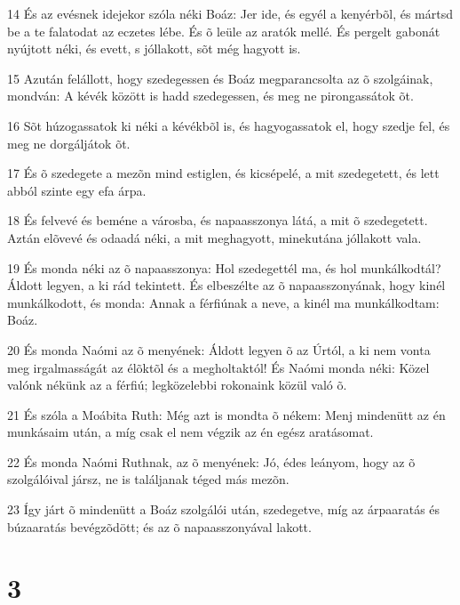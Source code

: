 \par 14 És az evésnek idejekor szóla néki Boáz: Jer ide, és egyél a kenyérbõl, és mártsd be a te falatodat az eczetes lébe. És õ leüle az aratók mellé. És pergelt gabonát nyújtott néki, és evett, s jóllakott, sõt még hagyott is.
\par 15 Azután felállott, hogy szedegessen és Boáz megparancsolta az õ szolgáinak, mondván: A kévék között is hadd szedegessen, és meg ne pirongassátok õt.
\par 16 Sõt húzogassatok ki néki a kévékbõl is, és hagyogassatok el, hogy szedje fel, és meg ne dorgáljátok õt.
\par 17 És õ szedegete a mezõn mind estiglen, és kicsépelé, a mit szedegetett, és lett abból szinte egy efa árpa.
\par 18 És felvevé és beméne a városba, és napaasszonya látá, a mit õ szedegetett. Aztán elõvevé és odaadá néki, a mit meghagyott, minekutána jóllakott vala.
\par 19 És monda néki az õ napaasszonya: Hol szedegettél ma, és hol munkálkodtál? Áldott legyen, a ki rád tekintett. És elbeszélte az õ napaasszonyának, hogy kinél munkálkodott, és monda: Annak a férfiúnak a neve, a kinél ma munkálkodtam: Boáz.
\par 20 És monda Naómi az õ menyének: Áldott legyen õ az Úrtól, a ki nem vonta meg irgalmasságát az élõktõl és a megholtaktól! És Naómi monda néki: Közel valónk nékünk az a férfiú; legközelebbi rokonaink közül való õ.
\par 21 És szóla a Moábita Ruth: Még azt is mondta õ nékem: Menj mindenütt az én munkásaim után, a míg csak el nem végzik az én egész aratásomat.
\par 22 És monda Naómi Ruthnak, az õ menyének: Jó, édes leányom, hogy az õ szolgálóival jársz, ne is találjanak téged más mezõn.
\par 23 Így járt õ mindenütt a Boáz szolgálói után, szedegetve, míg az árpaaratás és búzaaratás bevégzõdött; és az õ napaasszonyával lakott.

\chapter{3}


